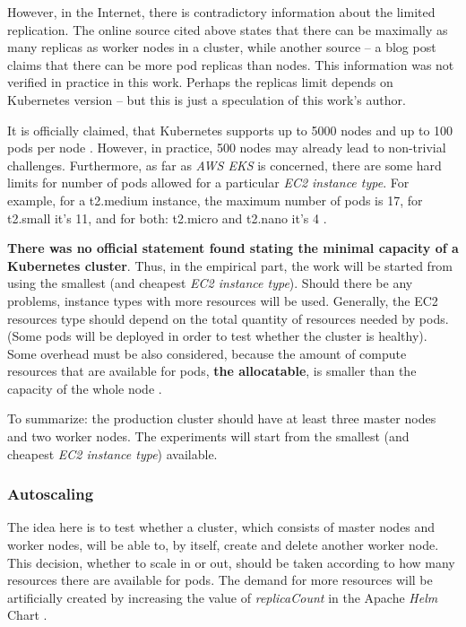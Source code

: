 However, in the Internet, there is contradictory information about the limited replication. The online source cited above \cite{kubernetes-node-size} states that there can be maximally as many replicas as worker nodes in a cluster, while another source -- a blog post \cite{learnk8s-ll} claims that there can be more pod replicas than nodes. This information was not verified in practice in this work. Perhaps the replicas limit depends on Kubernetes version -- but this is just a speculation of this work's author.

It is officially claimed, that Kubernetes supports up to 5000 nodes and up to 100 pods per node \cite{kubernetes-large,kubernetes-node-size}. However, in practice, 500 nodes may already lead to non-trivial challenges. Furthermore, as far as \textit{AWS EKS} is concerned, there are some hard limits for number of pods allowed for a particular \textit{EC2 instance type}. For example, for a t2.medium instance, the maximum number of pods is 17, for t2.small it's 11, and for both: t2.micro and t2.nano it's 4 \cite{eks-hard-limits,kubernetes-node-size}.

\textbf{There was no official statement found stating the minimal capacity of a Kubernetes cluster}. Thus, in the empirical part, the work will be started from using the smallest (and cheapest \textit{EC2 instance type}). Should there be any problems, instance types with more resources will be used. Generally, the EC2 resources type should depend on the total quantity of resources needed by pods. (Some pods will be deployed in order to test whether the cluster is healthy). Some overhead must be also considered, because the amount of compute resources that are available for pods, \textbf{the allocatable}, is smaller than the capacity of the whole node \cite{k8s-alloc}.

To summarize: the production cluster should have at least three master nodes and two worker nodes. The experiments will start from the smallest (and cheapest \textit{EC2 instance type}) available.

\subsubsection{Autoscaling}

The idea here is to test whether a cluster, which consists of master nodes and worker nodes, will be able to, by itself, create and delete another worker node. This decision, whether to scale in or out, should be taken according to how many resources there are available for pods. The demand for more resources will be artificially created by increasing the value of \textit{replicaCount} in the Apache \textit{Helm} Chart \cite{helm-apache}.


